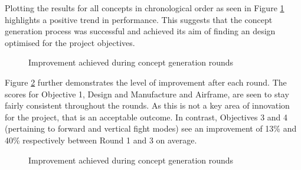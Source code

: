 Plotting the results for all concepts in chronological order as seen in Figure \ref{fig:concept_summary} highlights a positive trend in performance. This suggests that the concept generation process was successful and achieved its aim of finding an design optimised for the project objectives. 

\begin{figure}[H]
    \centering
    \caption{Improvement achieved during concept generation rounds}
    \label{fig:concept_summary}
\end{figure}

Figure \ref{fig:improvement} further demonstrates the level of improvement after each round. The scores for Objective 1, Design and Manufacture and Airframe, are seen to stay fairly consistent throughout the rounds. As this is not a key area of innovation for the project, that is an acceptable outcome. In contrast, Objectives 3 and 4 (pertaining to forward and vertical fight modes) see an improvement of 13\% and 40\% respectively between Round 1 and 3 on average.

\begin{figure}[H]
    \centering
    \caption{Improvement achieved during concept generation rounds}
    \label{fig:improvement}
\end{figure}


